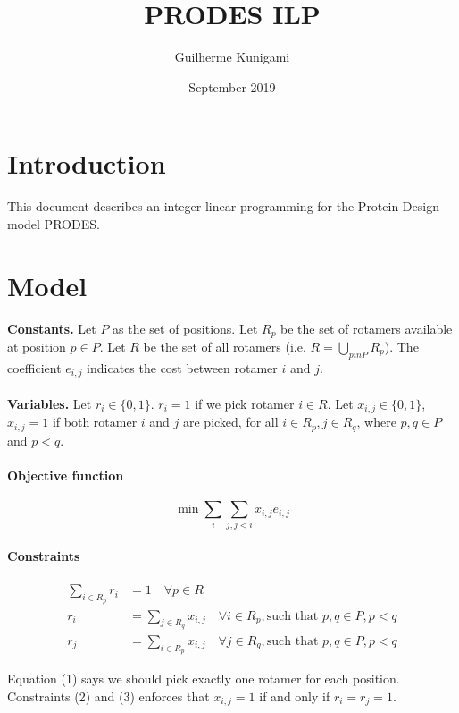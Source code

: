 \documentclass{article}
\title{PRODES ILP}
\author{Guilherme Kunigami}
\date{September 2019}
\begin{document}
\maketitle

\section{Introduction}

This document describes an integer linear programming for the Protein Design model PRODES.

\section{Model}

\textbf{Constants.} Let $P$ as the set of positions. Let $R_p$ be the set of rotamers available at position $p \in P$. Let $R$ be the set of all rotamers (i.e. $R = \bigcup_{p in P} R_p$). The coefficient $e_{i,j}$ indicates the cost between rotamer $i$ and $j$.
\\
\\
\textbf{Variables.} Let $r_{i} \in \{0, 1\}$. $r_{i} = 1$ if we pick rotamer $i \in R$. Let $x_{i,j} \in \{0, 1\}$, $x_{i,j} = 1$ if both rotamer $i$ and $j$ are picked, for all $i \in R_p, j \in R_q$, where $p, q \in P$ and $p < q$.
\\
\paragraph{Objective function}
$$
\min \sum_{i} \sum_{j, j < i}x_{i,j} e_{i,j}
$$

\paragraph{Constraints}
\begin{align}
\sum_{i \in R_p} r_{i} & = 1 \quad \forall p \in R \\
r_{i} & = \sum_{j \in R_q} x_{i, j} \quad \forall i \in R_p, \mbox{such that } p, q \in P, p < q \\
r_{j} & = \sum_{i \in R_p} x_{i, j} \quad \forall j \in  R_q, \mbox{such that } p, q \in P, p < q
\end{align}

Equation (1) says we should pick exactly one rotamer for each position. Constraints (2) and (3) enforces that $x_{i, j} = 1$ if and only if $r_i = r_j = 1$.
\end{document}
